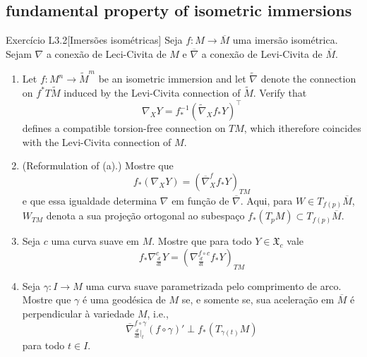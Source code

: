 \subsection{fundamental property of isometric immersions}

\begin{thing6}{Exercício L3.2}[Imersões isométricas]\label{exer:L3.2}\leavevmode
Seja \(f:M \to \overline{M}\) uma imersão isométrica. Sejam \(\nabla\) a conexão de Leci-Civita de \(M\) e \(\overline{\nabla}\) a conexão de Levi-Civita de \(\overline{M}\).
\begin{enumerate}[label=(\alph*)]
\item Let \(f:M^n \to \widetilde{M}^m\) be an isometric immersion and let \(\widetilde{\nabla}\) denote the connection on \(f^*T \widetilde{M}\) induced by the Levi-Civita connection of \(\widetilde{M}\). Verify that
	\[\nabla_XY=f^{-1}_*\left(\widetilde{\nabla}_X f_*Y\right)^\top\]
defines a compatible torsion-free connection on \(TM\), which itherefore coincides with the Levi-Civita connection of \(M\).	

\item  (Reformulation of (a).) Mostre que
	\[f_*(\nabla_XY)=\left(\overline{\nabla}^f_Xf_*Y\right)_{TM}\]
e que essa igualdade determina \(\nabla\) em função de \(\overline{\nabla}\). Aqui, para \(W \in T_{f(p)}\overline{M}\), \(W_{TM}\) denota a sua projeção ortogonal ao subespaço \(f_*(T_pM) \subset T_{f(p)}\overline{M}\).
\item Seja \(c\) uma curva suave em \(M\). Mostre que para todo \(Y \in \mathfrak{X}_c\) vale
	\[f_*\nabla^c_{\frac{d}{dt}}Y=\left(\nabla^{f \circ c}_{\frac{d}{dt}}f_*Y\right)_{TM} \]
\item Seja \(\gamma:I \to M\) uma curva suave parametrizada pelo comprimento de arco. Mostre que \(\gamma\) é uma geodésica de \(M\) se, e somente se, sua aceleração em \(\overline{M}\) é perpendicular à variedade \(M\), i.e.,
	\[\overline{\nabla}^{f \circ \gamma}_{\frac{d}{dt}\Big|_{t}}(f \circ \gamma)' \perp f_*(T_{\gamma(t)}M)\]
	para todo \(t \in I\).
\end{enumerate}
\end{thing6}

